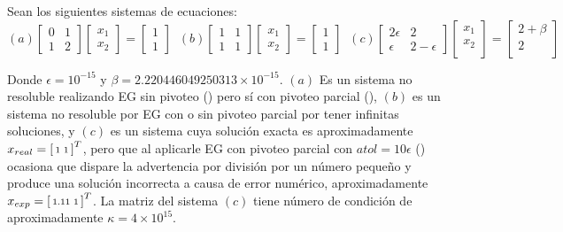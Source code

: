 Sean los siguientes sistemas de ecuaciones:
\[
(a) 
\begin{bmatrix}
    0  &  1      \\
    1  &  2      
\end{bmatrix}
\begin{bmatrix}
    x_1          \\
    x_2      
\end{bmatrix} 
= 
\begin{bmatrix}
    1            \\
    1 
\end{bmatrix} 
\phantom{..}
(b) 
\begin{bmatrix}
    1  &  1      \\
    1  &  1      
\end{bmatrix}
\begin{bmatrix}
    x_1          \\
    x_2      
\end{bmatrix} 
= 
\begin{bmatrix}
    1            \\
    1 
\end{bmatrix}
\phantom{..}
(c) 
\begin{bmatrix}
    2\epsilon & 2 \\
    \epsilon & 2-\epsilon
\end{bmatrix}
\begin{bmatrix}
    x_1          \\
    x_2          \\
\end{bmatrix} 
= 
\begin{bmatrix}
    2+\beta      \\
    2            \\
\end{bmatrix} 
\]

Donde $\epsilon = 10^{-15}$ y $\beta = 2.220446049250313\times 10^{-15}$. $(a)$ Es un sistema no resoluble realizando EG sin pivoteo () pero sí con pivoteo parcial (), $(b)$ es un sistema no resoluble por EG con o sin pivoteo parcial por tener infinitas soluciones, y $(c)$ es un sistema cuya solución exacta es aproximadamente $x_{real} = \begin{bsmallmatrix}1 & 1\end{bsmallmatrix}^T$, pero que al aplicarle EG con pivoteo parcial con $atol = 10\epsilon$ () ocasiona que dispare la advertencia por división por un número pequeño y produce una solución incorrecta a causa de error numérico, aproximadamente $x_{exp} = \begin{bsmallmatrix}1.11 & 1\end{bsmallmatrix}^T$. La matriz del sistema $(c)$ tiene número de condición de aproximadamente $\kappa = 4\times10^{15}$.

